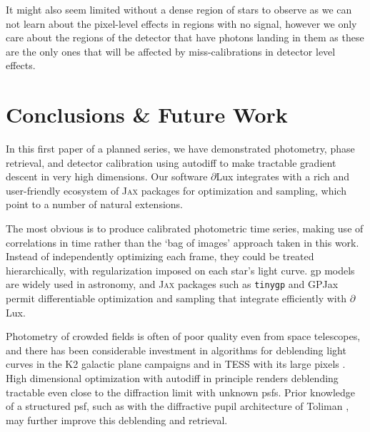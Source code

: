\documentclass[]{spieman}
\newcommand\jax{\textsc{Jax}\xspace}
\newcommand\dlux{$\partial$Lux\xspace}
\begin{document}
It might also seem limited without a dense region of stars to observe as we can not learn about the pixel-level effects in regions with no signal, however we only care about the regions of the detector that have photons landing in them as these are the only ones that will be affected by miss-calibrations in detector level effects.


\section{Conclusions \& Future Work}
In this first paper of a planned series, we have demonstrated photometry, phase retrieval, and detector calibration using autodiff to make tractable gradient descent in very high dimensions. Our software \dlux integrates with a rich and user-friendly ecosystem of \jax packages for optimization and sampling, which point to a number of natural extensions.

The most obvious is to produce calibrated photometric time series, making use of correlations in time rather than the `bag of images' approach taken in this work. Instead of independently optimizing each frame, they could be treated hierarchically, with regularization imposed on each star's light curve. \ac{gp} models are widely used in astronomy, and \jax packages such as \texttt{tinygp} \cite{Aigrain2022} and GPJax \cite{Pinder2022} permit differentiable optimization and sampling that integrate efficiently with \dlux. 

Photometry of crowded fields is often of poor quality even from space telescopes, and there has been considerable investment in algorithms for deblending light curves in the K2 galactic plane campaigns \cite{Zhu2017} and in TESS with its large pixels \cite{Nardiello2019,Hedges2021,Higgins2022}. High dimensional optimization with autodiff in principle renders deblending tractable even close to the diffraction limit with unknown \ac{psf}s. Prior knowledge of a structured \ac{psf}, such as with the diffractive pupil architecture of Toliman \cite{Guyon2012,Guyon2013}, may further improve this deblending and retrieval. 
\end{document}
